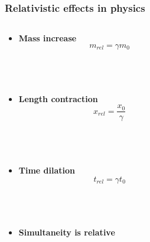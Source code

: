 \documentclass[mathserif,8pt]{beamer}
\begin{document}
\begin{frame}
    \frametitle{Relativistic effects in physics}
    \begin{columns}
    \begin{column}{.30\textwidth}
    \begin{itemize}
	\item \textbf{Mass increase}
	    \begin{equation}
		\nonumber
		m_{rel} = \gamma m_0
	    \end{equation}
	\ \\
	\ \\
	\ \\
	\item \textbf{Length contraction}
	    \begin{equation}
		\nonumber
		x_{rel} = \frac{x_0}{\gamma}
	    \end{equation}
	\ \\
	\ \\
	\ \\
	\item \textbf{Time dilation}
	    \begin{equation}
		\nonumber
		t_{rel} = \gamma t_0
	    \end{equation}
	\ \\
	\ \\
	\ \\
	\item \textbf{Simultaneity is relative}
    \end{itemize}
    \end{column}
    \begin{column}{.70\textwidth}
	\centering
	\ \\
	\ \\
	\ \\
	\ \\

\end{column}
\end{columns}
\end{frame}
\end{document}
